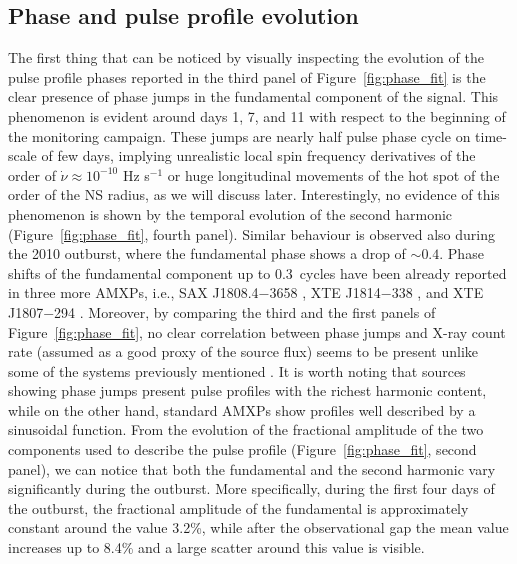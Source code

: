 \documentclass[fleqn,usenatbib]{mnras}
\newcommand{\swiftj}{SWIFT J1749.4$-$2807}
\begin{document}

\subsection{Phase and pulse profile evolution}
\label{sec:phase}
The first thing that can be noticed by visually inspecting the evolution of the pulse profile phases reported in the third panel of Figure~\ref{fig:phase_fit} is the clear presence of phase jumps in the fundamental component of the signal. This phenomenon is evident around days 1, 7, and 11 with respect to the beginning of the monitoring campaign. These jumps are nearly half pulse phase cycle on time-scale of few days, implying unrealistic local spin frequency derivatives of the order of $\dot{\nu} \approx 10^{-10}$ Hz s$^{-1}$ or huge longitudinal movements of the hot spot of the order of the NS radius, as we will discuss later. Interestingly, no evidence of this phenomenon is shown by the temporal evolution of the second harmonic (Figure~\ref{fig:phase_fit}, fourth panel). Similar behaviour is observed also during the 2010 outburst, where the fundamental phase shows a drop of $\sim0.4$. Phase shifts of the fundamental component up to 0.3~cycles have been already reported in three more AMXPs, i.e., SAX J1808.4$-$3658 \citep{Burderi:2006va}, XTE J1814$-$338 \citep{Papitto:2007wp}, and XTE J1807$-$294 \citep{Riggio:2008wz,Patruno:2010wi}. Moreover, by comparing the third and the first panels of Figure~\ref{fig:phase_fit}, no clear correlation between phase jumps and X-ray count rate (assumed as a good proxy of the source flux) seems to be present unlike some of the systems previously mentioned \citep[see e.g.,][]{Papitto:2007wp,Patruno:2010wi}. It is worth noting that sources showing phase jumps present pulse profiles with the richest harmonic content, while on the other hand, standard AMXPs show profiles well described by a sinusoidal function. From the evolution of the fractional amplitude of the two components used to describe the pulse profile (Figure~\ref{fig:phase_fit}, second panel), we can notice that both the fundamental and the second harmonic vary significantly during the outburst. More specifically, during the first four days of the outburst, the fractional amplitude of the fundamental is approximately constant around the value 3.2\%, while after the observational gap the mean value increases up to 8.4\% and a large scatter around this value is visible. 
\end{document}
